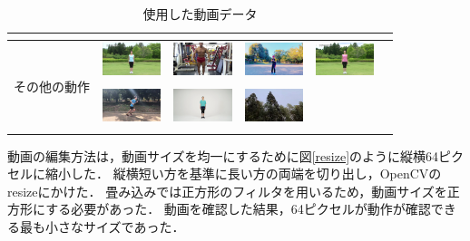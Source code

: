\begin{table}[t]
\begin{center}
\begin{tabular}{|c|c|c|c|c|c|}
        & \cite{manolo} & \cite{aito} & & \cite{hyoga} & \cite{legit}
      \\ \hline
      \multirow{4}{*}{その他の動作}
        & \includegraphics[width=17mm]{images/snaps/radio_exer.png}
        & \includegraphics[width=17mm]{images/snaps/posing.png}
        & \includegraphics[width=17mm]{images/snaps/shadowboxing.png}
        & \includegraphics[width=17mm]{images/snaps/radio_exer_2.png}
        &
      \\ \cline{2-6}
        & \cite{radio} & \cite{posing} & \cite{boxing} & \cite{radio2} &
      \\ \cline{2-6}
        & \includegraphics[width=17mm]{images/snaps/running.png}
        & \includegraphics[width=17mm]{images/snaps/shinkokyu.png}
        & \includegraphics[width=17mm]{images/snaps/leaves.png}
        &
        &
      \\ \cline{2-6}
        & \cite{running} & \cite{shinkokyu} & \cite{leaves} & &
      \\ \hline
    \end{tabular}
  \end{center}
  \caption{使用した動画データ}
  \label{video_data}
\end{table}

動画の編集方法は，動画サイズを均一にするために図\ref{resize}のように縦横64ピクセルに縮小した．
縦横短い方を基準に長い方の両端を切り出し，OpenCVのresize\cite{resize}にかけた．
畳み込みでは正方形のフィルタを用いるため，動画サイズを正方形にする必要があった．
動画を確認した結果，64ピクセルが動作が確認できる最も小さなサイズであった．

